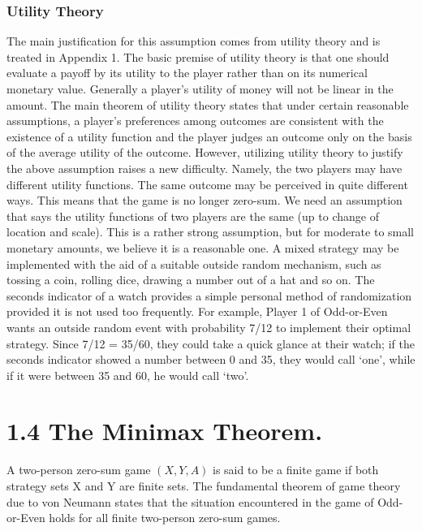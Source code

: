 \subsubsection{Utility Theory}
The main justification for this assumption comes from utility theory and is treated
in Appendix 1. The basic premise of utility theory is that one should evaluate a payoff by
its utility to the player rather than on its numerical monetary value. Generally a player’s
utility of money will not be linear in the amount. The main theorem of utility theory
states that under certain reasonable assumptions, a player’s preferences among outcomes
are consistent with the existence of a utility function and the player judges an outcome
only on the basis of the average utility of the outcome.
However, utilizing utility theory to justify the above assumption raises a new difficulty.
Namely, the two players may have different utility functions. The same outcome may be
perceived in quite different ways. This means that the game is no longer zero-sum. We
need an assumption that says the utility functions of two players are the same (up to
change of location and scale). This is a rather strong assumption, but for moderate to
small monetary amounts, we believe it is a reasonable one.
A mixed strategy may be implemented with the aid of a suitable outside random
mechanism, such as tossing a coin, rolling dice, drawing a number out of a hat and so
on. The seconds indicator of a watch provides a simple personal method of randomization
provided it is not used too frequently. For example, Player 1 of Odd-or-Even wants an
outside random event with probability 7/12 to implement their optimal strategy. Since
7/12 = 35/60, they could take a quick glance at their watch; if the seconds indicator showed
a number between 0 and 35, they would call ‘one’, while if it were between 35 and 60, he
would call ‘two’.
\section{1.4 The Minimax Theorem.} A two-person zero-sum game $(X, Y, A)$ is said to be
a finite game if both strategy sets X and Y are finite sets. The fundamental theorem
of game theory due to von Neumann states that the situation encountered in the game of
Odd-or-Even holds for all finite two-person zero-sum games. 

